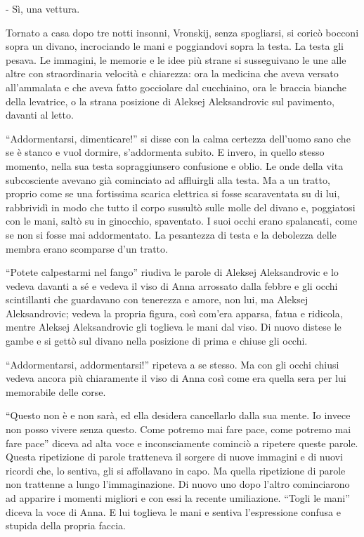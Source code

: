 - Sì, una vettura. 

Tornato a casa dopo tre notti insonni, Vronskij, senza spogliarsi, si coricò bocconi sopra un divano, incrociando le mani e poggiandovi sopra la testa. La testa gli pesava. Le immagini, le memorie e le idee più strane si susseguivano le une alle altre con straordinaria velocità e chiarezza: ora la medicina che aveva versato all'ammalata e che aveva fatto gocciolare dal cucchiaino, ora le braccia bianche della levatrice, o la strana posizione di Aleksej Aleksandrovic sul pavimento, davanti al letto. 

``Addormentarsi, dimenticare!'' si disse con la calma certezza dell'uomo sano che se è stanco e vuol dormire, s'addormenta subito. E invero, in quello stesso momento, nella sua testa sopraggiunsero confusione e oblio. Le onde della vita subcosciente avevano già cominciato ad affluirgli alla testa. Ma a un tratto, proprio come se una fortissima scarica elettrica si fosse scaraventata su di lui, rabbrividì in modo che tutto il corpo sussultò sulle molle del divano e, poggiatosi con le mani, saltò su in ginocchio, spaventato. I suoi occhi erano spalancati, come se non si fosse mai addormentato. La pesantezza di testa e la debolezza delle membra erano scomparse d'un tratto. 

``Potete calpestarmi nel fango'' riudiva le parole di Aleksej Aleksandrovic e lo vedeva davanti a sé e vedeva il viso di Anna arrossato dalla febbre e gli occhi scintillanti che guardavano con tenerezza e amore, non lui, ma Aleksej Aleksandrovic; vedeva la propria figura, così com'era apparsa, fatua e ridicola, mentre Aleksej Aleksandrovic gli toglieva le mani dal viso. Di nuovo distese le gambe e si gettò sul divano nella posizione di prima e chiuse gli occhi. 

``Addormentarsi, addormentarsi!'' ripeteva a se stesso. Ma con gli occhi chiusi vedeva ancora più chiaramente il viso di Anna così come era quella sera per lui memorabile delle corse. 

``Questo non è e non sarà, ed ella desidera cancellarlo dalla sua mente. Io invece non posso vivere senza questo. Come potremo mai fare pace, come potremo mai fare pace'' diceva ad alta voce e inconsciamente cominciò a ripetere queste parole. Questa ripetizione di parole tratteneva il sorgere di nuove immagini e di nuovi ricordi che, lo sentiva, gli si affollavano in capo. Ma quella ripetizione di parole non trattenne a lungo l'immaginazione. Di nuovo uno dopo l'altro cominciarono ad apparire i momenti migliori e con essi la recente umiliazione. ``Togli le mani'' diceva la voce di Anna. E lui toglieva le mani e sentiva l'espressione confusa e stupida della propria faccia. 

